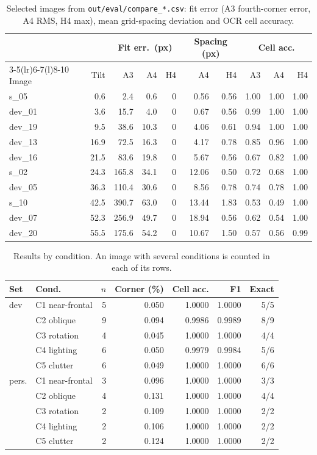 \documentclass[conference]{IEEEtran}
\begin{document}
\begin{table}[h]
\centering\footnotesize
\caption{Selected images from \texttt{out/eval/compare\_*.csv}: fit error (A3 fourth-corner error, A4 RMS, H4 max), mean grid-spacing deviation and OCR cell accuracy.}
\label{tab:compare}
\setlength{\tabcolsep}{3pt}
\begin{tabular}{@{}l r r r r r r r r r@{}}
\toprule
 & & \multicolumn{3}{c}{Fit err.\ (px)} & \multicolumn{2}{c}{Spacing (px)} & \multicolumn{3}{c}{Cell acc.}\\
\cmidrule(lr){3-5}\cmidrule(lr){6-7}\cmidrule(l){8-10}
Image & Tilt & A3 & A4 & H4 & A4 & H4 & A3 & A4 & H4\\
\midrule
s\_05 & 0.6 & 2.4 & 0.6 & 0 & 0.56 & 0.56 & 1.00 & 1.00 & 1.00\\
dev\_01 & 3.6 & 15.7 & 4.0 & 0 & 0.67 & 0.56 & 0.99 & 1.00 & 1.00\\
dev\_19 & 9.5 & 38.6 & 10.3 & 0 & 4.06 & 0.61 & 0.94 & 1.00 & 1.00\\
dev\_13 & 16.9 & 72.5 & 16.3 & 0 & 4.17 & 0.78 & 0.85 & 0.96 & 1.00\\
dev\_16 & 21.5 & 83.6 & 19.8 & 0 & 5.67 & 0.56 & 0.67 & 0.82 & 1.00\\
s\_02 & 24.3 & 165.8 & 34.1 & 0 & 12.06 & 0.50 & 0.72 & 0.68 & 1.00\\
dev\_05 & 36.3 & 110.4 & 30.6 & 0 & 8.56 & 0.78 & 0.74 & 0.78 & 1.00\\
s\_10 & 42.5 & 390.7 & 63.0 & 0 & 13.44 & 1.83 & 0.53 & 0.49 & 1.00\\
dev\_07 & 52.3 & 256.9 & 49.7 & 0 & 18.94 & 0.56 & 0.62 & 0.54 & 1.00\\
dev\_20 & 55.5 & 175.6 & 54.2 & 0 & 10.67 & 1.50 & 0.57 & 0.56 & 0.99\\
\bottomrule
\end{tabular}
\end{table}
\begin{table}[h]
\centering\footnotesize
\caption{Results by condition. An image with several conditions is counted in each of its rows.}
\label{tab:cond}
\setlength{\tabcolsep}{4pt}
\begin{tabular}{@{}l l r r r r r@{}}
\toprule
Set & Cond. & $n$ & Corner (\%) & Cell acc. & F1 & Exact\\
\midrule
dev & C1 near-frontal & 5 & 0.050 & 1.0000 & 1.0000 & 5/5\\
 & C2 oblique & 9 & 0.094 & 0.9986 & 0.9989 & 8/9\\
 & C3 rotation & 4 & 0.045 & 1.0000 & 1.0000 & 4/4\\
 & C4 lighting & 6 & 0.050 & 0.9979 & 0.9984 & 5/6\\
 & C5 clutter & 6 & 0.049 & 1.0000 & 1.0000 & 6/6\\
\midrule
pers. & C1 near-frontal & 3 & 0.096 & 1.0000 & 1.0000 & 3/3\\
 & C2 oblique & 4 & 0.131 & 1.0000 & 1.0000 & 4/4\\
 & C3 rotation & 2 & 0.109 & 1.0000 & 1.0000 & 2/2\\
 & C4 lighting & 2 & 0.106 & 1.0000 & 1.0000 & 2/2\\
 & C5 clutter & 2 & 0.124 & 1.0000 & 1.0000 & 2/2\\
\bottomrule
\end{tabular}
\end{table}
\end{document}
